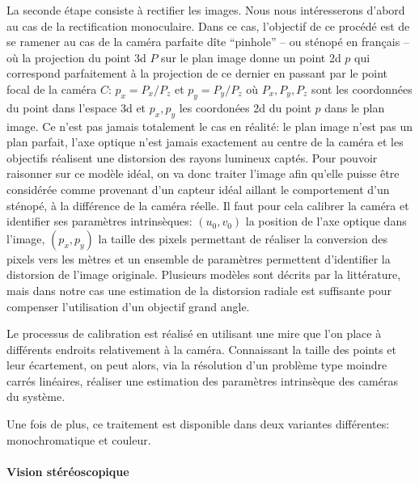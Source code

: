 La seconde étape consiste à rectifier les images. Nous nous
intéresserons d'abord au cas de la rectification
monoculaire. Dans ce cas, l'objectif de ce procédé est de se ramener
au cas de la caméra parfaite dîte
``pinhole'' -- ou sténopé en français -- où la projection
du point 3d $P$ sur le plan image donne un point 2d $p$ qui correspond
parfaitement à la projection de ce dernier en passant par le point
focal de la caméra $C$: $p_x = P_x / P_z$ et $p_y = P_y / P_z$ où
$P_x, P_y, P_z$ sont les coordonnées du point dans l'espace 3d et
$p_x, p_y$ les coordonées 2d du point $p$ dans le plan image. Ce n'est
pas jamais totalement le cas en réalité: le plan image n'est pas un
plan parfait, l'axe optique n'est jamais exactement au centre de la
caméra et les objectifs réalisent une distorsion des
rayons lumineux captés. Pour pouvoir raisonner sur ce modèle idéal, on
va donc traiter l'image afin qu'elle puisse être considérée comme
provenant d'un capteur idéal aillant le comportement d'un sténopé, à
la différence de la caméra réelle. Il faut pour cela calibrer la
caméra et identifier ses paramètres intrinsèques: $(u_0, v_0)$ la position de l'axe optique
dans l'image, $(p_x, p_y)$ la taille des pixels permettant de réaliser
la conversion des pixels vers les mètres et un ensemble de paramètres
permettent d'identifier la distorsion de l'image originale. Plusieurs
modèles sont décrits par la littérature, mais dans notre cas une
estimation de la distorsion radiale est
suffisante pour compenser l'utilisation d'un objectif grand angle.


Le processus de calibration est réalisé en utilisant une mire que l'on
place à différents endroits relativement à la caméra. Connaissant la
taille des points et leur écartement, on peut alors, via la résolution
d'un problème type moindre carrés linéaires, réaliser une estimation
des paramètres intrinsèque des caméras du système.

Une fois de plus, ce traitement est disponible dans deux variantes
différentes: monochromatique et couleur.


\paragraph{Vision stéréoscopique}


